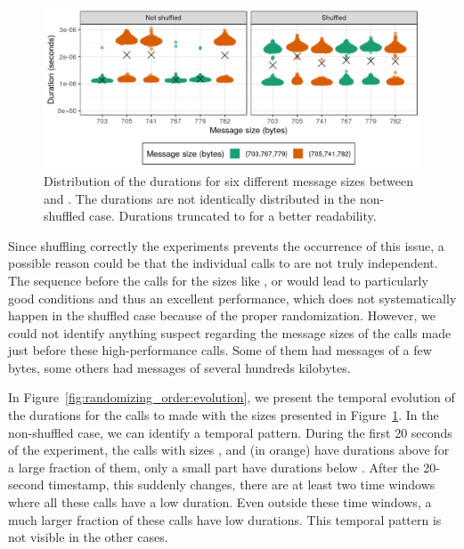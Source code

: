         \begin{figure}[htpb]
            \centering
            \includegraphics[width=\linewidth]{img/experiment/randomizing_order/distribution.png}
            \caption{Distribution of the \recv durations for six different message sizes between  and
            .  The durations are not identically distributed in the non-shuffled case.  Durations
            truncated to  for a better readability.}%
            \label{fig:randomizing_order:distribution}
        \end{figure}

        Since shuffling correctly the experiments prevents the occurrence of this issue, a possible reason could be that
        the individual calls to \recv are not truly independent. The sequence before the calls for the sizes like
        ,  or  would lead to particularly good conditions and thus an
        excellent performance, which does not systematically happen in the shuffled case because of the proper
        randomization. However, we could not identify anything suspect regarding the message sizes of the calls made
        just before these high-performance calls. Some of them had messages of a few bytes, some others had messages of
        several hundreds kilobytes.

        In Figure~\ref{fig:randomizing_order:evolution}, we present the temporal evolution of the durations for the
        calls to \recv made with the sizes presented in Figure~\ref{fig:randomizing_order:distribution}. In the
        non-shuffled case, we can identify a temporal pattern. During the first 20 seconds of the experiment, the
        calls with sizes ,  and  (in orange) have durations above
         for a large fraction of them, only a small part have durations below
        . After the 20-second timestamp, this suddenly changes, there are at least two time
        windows where all these calls have a low duration. Even outside these time windows, a much larger fraction of
        these calls have low durations. This temporal pattern is not visible in the other cases.

